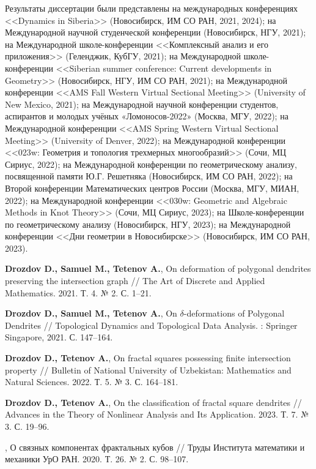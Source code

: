 \documentclass[a5paper,9pt,twoside]{extarticle} %
\begin{document}
Результаты диссертации были представлены на международных конференциях <<Dynamics in Siberia>> (Новосибирск, ИМ СО РАН, 2021, 2024); 
на Международной научной студенческой конференции (Новосибирск, НГУ, 2021);
на Международной школе-конференции <<Комплексный анализ и его приложения>> (Геленджик, КубГУ, 2021); 
на Международной школе-конференции <<Siberian summer conference: Current developments in Geometry>> (Новосибирск, НГУ, ИМ СО РАН, 2021); 
на Международной конференции <<AMS Fall Western Virtual Sectional Meeting>> (University of New Mexico, 2021); 
на Международной научной конференции студентов, аспирантов и молодых учёных «Ломоносов-2022» (Москва, МГУ, 2022); 
на Международной конференции <<AMS Spring Western Virtual Sectional Meeting>> (University of Denver, 2022); 
на Международной конференции <<023w: Геометрия и топология трехмерных многообразий>> (Сочи, МЦ Сириус, 2022); 
на Международной конференции по геометрическому анализу, посвященной памяти Ю.Г. Решетняка (Новосибирск, ИМ СО РАН, 2022); 
на Второй конференции Математических центров России (Москва, МГУ, МИАН, 2022); 
на Международной конференции <<030w: Geometric and Algebraic Methods in Knot Theory>> (Сочи, МЦ Сириус, 2023);
на Школе-конференции по геометрическому анализу
(Новосибирск, НГУ, 2023);
на Международной конференции <<Дни геометрии в Новосибирске>> (Новосибирск, ИМ СО РАН, 2023).



\begin{thebibliography}{9}

{\bf Drozdov D., Samuel M., Tetenov A.},
On deformation of polygonal dendrites preserving the intersection graph //
The Art of Discrete and Applied Mathematics. 2021. Т. 4. № 2. С. 1--21.

{\bf Drozdov D., Samuel M., Tetenov A.}, 
On $\delta$-deformations of Polygonal Dendrites // 
Topological Dynamics and Topological Data Analysis. : Springer Singapore, 2021. С. 147--164.

{\bf Drozdov D., Tetenov A.}, 
On fractal squares possessing finite intersection property // 
Bulletin of National University of Uzbekistan: Mathematics and Natural Sciences. 2022. Т. 5. № 3. С. 164--181.

{\bf Drozdov D., Tetenov A.}, 
On the classification of fractal square dendrites // 
Advances in the Theory of Nonlinear Analysis and Its Application. 2023. Т. 7. № 3. С. 19--96.

,
О связных компонентах фрактальных кубов // 
Труды Института математики и механики УрО РАН. 2020. Т. 26. № 2. С. 98--107.


\end{thebibliography}
\end{document}
